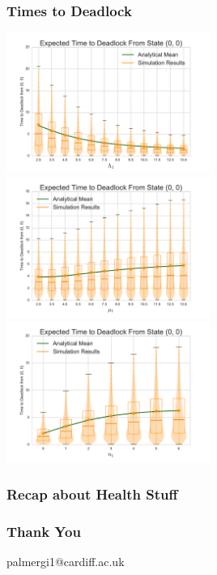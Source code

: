 \documentclass[xcolor={table}]{beamer}
\begin{document}
\begin{frame}
    \frametitle{Times to Deadlock}
    \includegraphics[width=0.5\textwidth]{vary_L1fb}
    \includegraphics[width=0.5\textwidth]{vary_mu1fb}\newline
    \centering
    \includegraphics[width=0.5\textwidth]{vary_n1fb}
\end{frame}

\begin{frame}
\frametitle{Recap about Health Stuff}
\end{frame}


\begin{frame}
    \frametitle{Thank You}
    palmergi1@cardiff.ac.uk
\end{frame}
\end{document}

